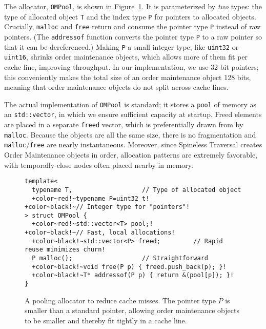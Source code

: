 The allocator, \texttt{OMPool},
  is shown in Figure~\ref{fig:allocator}.
It is parameterized by \emph{two} types:
  the type of allocated object \texttt{T}
  and the index type \texttt{P} for pointers to allocated objects.
Crucially,
  \texttt{malloc} and \texttt{free} return and consume
  the pointer type \texttt{P} instead of raw pointers.
(The \texttt{addressof} function converts
  the pointer type \texttt{P} to a raw pointer
  so that it can be dereferenced.)
Making \texttt{P} a small integer type,
  like \texttt{uint32} or \texttt{uint16},
  shrinks order maintenance objects,
  which allows more of them fit per cache line,
  improving throughput.
In our implementation, we use 32-bit pointers;
  this conveniently makes the total size
  of an order maintenance object 128 bits,
  meaning that order maintenance objects
  do not split across cache lines.

The actual implementation of \texttt{OMPool} is standard;
  it stores a \texttt{pool} of memory as an \texttt{std::vector},
  in which we ensure sufficient capacity at startup.
Freed elements are placed in a separate \texttt{freed} vector,
  which is preferentially drawn from by \texttt{malloc}.
Because the objects are all the same size,
  there is no fragmentation and \texttt{malloc}/\texttt{free}
  are nearly instantaneous.
Moreover, since Spineless Traversal
  creates Order Maintenance objects in order,
  allocation patterns are extremely favorable,
  with temporally-close nodes often placed nearby in memory.

\begin{figure}
\begin{Verbatim}[formatcom=\color{gray}, commandchars=+~!]
template<
  typename T,                   // Type of allocated object
  +color~red!~typename P=uint32_t!           +color~black!~// Integer type for "pointers"!
> struct OMPool {
  +color~red!~std::vector<T> pool;!          +color~black!~// Fast, local allocations!
  +color~black!~std::vector<P> freed;         // Rapid reuse minimizes churn!
  P malloc();                   // Straightforward
  +color~black!~void free(P p) { freed.push_back(p); }!
  +color~black!~T* addressof(P p) { return &(pool[p]); }!
}
\end{Verbatim}
\caption{A pooling allocator to reduce cache misses.
  The pointer type $P$ is smaller than a standard pointer,
    allowing order maintenance objects to be smaller
    and thereby fit tightly in a cache line.}
\label{fig:allocator}
\end{figure}

